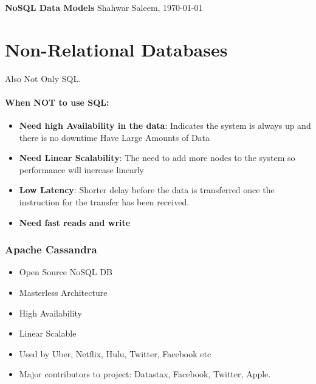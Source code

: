 \documentclass[
	paper=a4,%
	pagesize,%
	8pt, fleqn,%
	headings=small,%
	notitlepage,%
	parskip=never]%
	{scrreprt}
\newcommand{\mytitle}{NoSQL Data Models}
\newcommand{\myauthor}{Shahwar Saleem}
\begin{document}
\begin{multicols*}{3}

{\bfseries\sffamily\LARGE\mytitle} \vspace{0.35em}  \hfill \myauthor, \today \vspace{0.5em}



\hfill

\chapter{Non-Relational Databases}
Also Not Only SQL.


\subsubsection*{When NOT to use SQL:}
\begin{itemize}
\item \textbf{Need high Availability in the data}: Indicates the system is always up and there is no downtime
Have Large Amounts of Data

\item \textbf{Need Linear Scalability}: The need to add more nodes to the system so performance will increase linearly

\item \textbf{Low Latency}: Shorter delay before the data is transferred once the instruction for the transfer has been received.

\item \textbf{Need fast reads and write}

\end{itemize}

\subsection{Apache Cassandra}
\begin{itemize}
\item Open Source NoSQL DB
\item Masterless Architecture
\item High Availability
\item Linear Scalable
\item Used by Uber, Netflix, Hulu, Twitter, Facebook etc
\item Major contributors to project: Datastax, Facebook, Twitter, Apple.
\end{itemize}


\end{multicols*}
\end{document}
